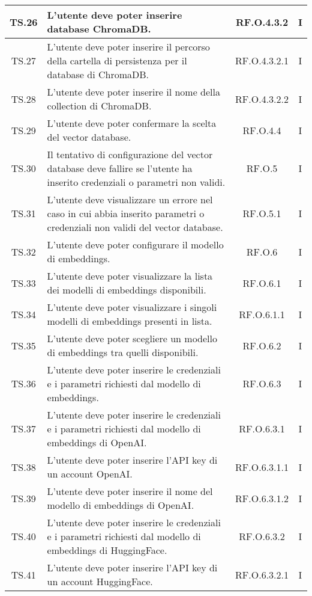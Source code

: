 {{{{{{{{{{\begin{xltabular}{\textwidth}{|c|X|c|c|}
    \hline
    TS.26 & L’utente deve poter inserire database ChromaDB. & RF.O.4.3.2 & I \\
    \hline
    TS.27 & L’utente deve poter inserire il percorso della cartella di persistenza per il database di ChromaDB. & RF.O.4.3.2.1 & I \\
    \hline
    TS.28 & L’utente deve poter inserire il nome della collection di ChromaDB. & RF.O.4.3.2.2 & I \\
    \hline
    TS.29 & L’utente deve poter confermare la scelta del vector database. & RF.O.4.4 & I \\
    \hline
    TS.30 & Il tentativo di configurazione del vector database deve fallire se l’utente ha inserito credenziali o parametri non validi. & RF.O.5 & I \\
    \hline
    TS.31 & L’utente deve visualizzare un errore nel caso in cui abbia inserito parametri o credenziali non validi del vector database. & RF.O.5.1 & I \\
    \hline
    TS.32 & L’utente deve poter configurare il modello di embeddings. & RF.O.6 & I \\
    \hline
    TS.33 & L’utente deve poter visualizzare la lista dei modelli di embeddings disponibili. & RF.O.6.1 & I \\
    \hline
    TS.34 & L’utente deve poter visualizzare i singoli modelli di embeddings presenti in lista. & RF.O.6.1.1 & I \\
    \hline
    TS.35 & L’utente deve poter scegliere un modello di embeddings tra quelli disponibili. & RF.O.6.2 & I \\
    \hline
    TS.36 & L’utente deve poter inserire le credenziali e i parametri richiesti dal modello di embeddings. & RF.O.6.3 & I \\
    \hline
    TS.37 & L’utente deve poter inserire le credenziali e i parametri richiesti dal modello di embeddings di OpenAI. & RF.O.6.3.1 & I \\
    \hline
    TS.38 & L’utente deve poter inserire l’API key di un account OpenAI. & RF.O.6.3.1.1 & I \\
    \hline
    TS.39 & L’utente deve poter inserire il nome del modello di embeddings di OpenAI. & RF.O.6.3.1.2 & I \\
    \hline
    TS.40 & L’utente deve poter inserire le credenziali e i parametri richiesti dal modello di embeddings di HuggingFace. & RF.O.6.3.2 & I \\
    \hline
    TS.41 & L’utente deve poter inserire l’API key di un account HuggingFace. & RF.O.6.3.2.1 & I \\

\end{xltabular}}}}}}}}}}}
